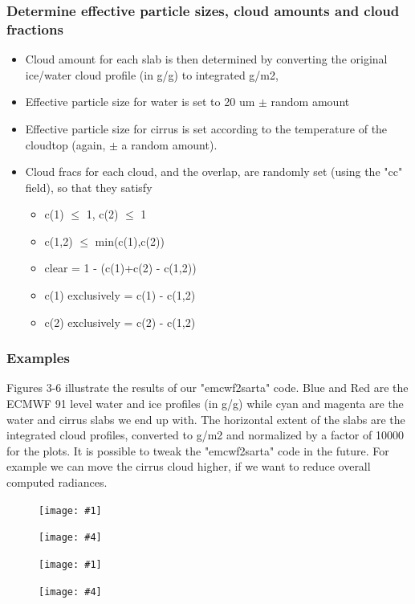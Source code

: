 \documentclass[11pt]{article}
\makeatletter
\newcommand{\dfigure}[6]
{
\begin{figure}
  \begin{minipage}[t]{0.45\textwidth}
  \centering
  \texttt{[image: \#1]}
   \caption{#2}  \label{#3}
  \end{minipage}
  \hfil
  \begin{minipage}[t]{0.45\linewidth}
  \centering
  \texttt{[image: \#4]}
   \caption{#5}  \label{#6}
  \end{minipage}
\end{figure}
}
\renewcommand{\section}{\@startsection {section}{1}{\z@}%
                                   {-3.5ex \@plus -1ex \@minus -.2ex}%
                                   {2.3ex \@plus.2ex}%
                                   {\reset@font\large\bfseries}}
\makeatother
\begin{document}
\subsubsection{Determine effective particle sizes, cloud amounts and cloud fractions}
\begin{itemize}
  \item Cloud amount for each slab is then determined by converting the original ice/water cloud profile (in g/g) to 
        integrated g/m2,
  \item Effective particle size for water is set to 20 um $\pm$ random amount
  \item Effective particle size for cirrus is set according to the temperature of the cloudtop (again, $\pm$ a random amount). 
  \item Cloud fracs for each cloud, and the overlap, are randomly set (using the "cc" field), so that they satisfy 
    \begin{itemize}
      \item c(1) $\le$ 1, c(2) $\le$ 1
      \item c(1,2) $\le$ min(c(1),c(2))
      \item clear = 1 - (c(1)+c(2) - c(1,2))
      \item c(1) exclusively = c(1) - c(1,2)
      \item c(2) exclusively = c(2) - c(1,2)
    \end{itemize}
\end{itemize}

\subsubsection{Examples}
Figures 3-6 illustrate the results of our "emcwf2sarta" code. Blue and Red are the ECMWF 91 level 
water and ice profiles (in g/g) while cyan and magenta are the water and cirrus slabs we end up with.
The horizontal extent of the slabs are the integrated cloud profiles, converted to g/m2 and normalized by
a factor of 10000 for the plots. It is possible to tweak the "emcwf2sarta" code in the future. For example
we can move the cirrus cloud higher, if we want to reduce overall computed radiances.

\dfigure{Figs/clouds_profile10.eps}{}{}{Figs/clouds_profile100.eps}{}{}
\dfigure{Figs/clouds_profile1000.eps}{}{}{Figs/clouds_profile2000.eps}{}{}

\end{document}
